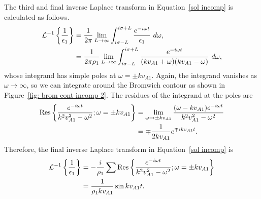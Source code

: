 The third and final inverse Laplace transform in Equation~\eqref{sol incomp} is calculated as follows.
\begin{align}
\mathcal{L}^{-1}\left\{ \frac{1}{\epsilon_1} \right\} &= \frac{1}{2\pi}\lim_{L \to \infty} \int_{i\sigma - L}^{i\sigma + L} \frac{e^{-i\omega t}}{\epsilon_1} ~d\omega, \notag \\
&= \frac{1}{2\pi\rho_1}\lim_{L \to \infty} \int_{i\sigma - L}^{i\sigma + L} \frac{e^{-i\omega t}}{(kv_{A1} + \omega)(kv_{A1} - \omega)} ~d\omega,
\end{align}
whose integrand has simple poles at $\omega = \pm k v_{A1}$. Again, the integrand vanishes as $\omega \to \infty$, so we can integrate around the Bromwich contour as shown in Figure~\ref{fig: brom cont incomp 2}. The residues of the integrand at the poles are
\begin{align}
\mathrm{Res}\left\{\frac{e^{-i\omega t}}{k^2v_{A1}^2 - \omega^2}; \omega = \pm kv_{A1} \right\} &= 
\lim_{\omega \to \pm kv_{A1}} \frac{(\omega - kv_{A1}) e^{-i\omega t}}{k^2v_{A1}^2 - \omega^2} \notag \\ 
&= \mp \frac{1}{2kv_{A1}} e^{\mp ikv_{A1} t}.
\end{align}
Therefore, the final inverse Laplace transform in Equation~\eqref{sol incomp} is
\begin{align}
\mathcal{L}^{-1}\left\{ \frac{1}{\epsilon_1} \right\} &= -\frac{i}{\rho_1} \sum \mathrm{Res} \left\{ \frac{e^{-i\omega t}}{k^2v_{A1}^2 - \omega^2}; \omega = \pm kv_{A1} \right\} \notag \\
&= \frac{1}{\rho_1kv_{A1}} \sin{kv_{A1}t}.
\end{align}

